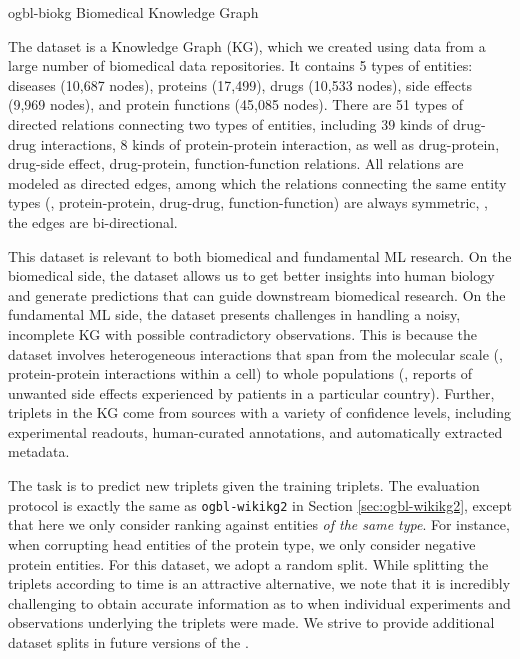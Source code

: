 \dataset
{ogbl-biokg}
{Biomedical Knowledge Graph}
{
The  dataset is a Knowledge Graph (KG), which we created using data from a large number of biomedical data repositories. 
It contains 5 types of entities: diseases (10,687 nodes), proteins (17,499), drugs (10,533 nodes), side effects (9,969 nodes), and protein functions (45,085 nodes). There are 51 types of directed relations connecting two types of entities, including 39 kinds of drug-drug interactions, 8 kinds of protein-protein interaction, as well as drug-protein, drug-side effect, drug-protein, function-function relations. All relations are modeled as directed edges, among which the relations connecting the same entity types (\eg, protein-protein, drug-drug, function-function) are always symmetric, \ie, the edges are bi-directional. 

This dataset is relevant to both biomedical and fundamental ML research.
On the biomedical side, the dataset allows us to get better insights into human biology and generate predictions that can guide downstream biomedical research. On the fundamental ML side, the dataset presents challenges in handling a noisy, incomplete KG with possible contradictory observations.
This is because the  dataset involves heterogeneous interactions that span from the molecular scale (\eg, protein-protein interactions within a cell) to whole populations (\eg, reports of unwanted side effects experienced by patients in a particular country). Further, triplets in the KG come from sources with a variety of confidence levels, including experimental readouts, human-curated annotations, and automatically extracted metadata. 
}
{The task is to predict new triplets given the training triplets. The evaluation protocol is exactly the same as \texttt{ogbl-wikikg2} in Section \ref{sec:ogbl-wikikg2}, except that here we only consider ranking against entities \emph{of the same type}. For instance, when corrupting head entities of the protein type, we only consider negative protein entities.
}
{For this dataset, we adopt a random split. While splitting the triplets according to time is an attractive alternative, we note that it is incredibly challenging to obtain accurate information as to when individual experiments and observations underlying the triplets were made. We strive to provide additional dataset splits in future versions of the \nameshort{}. 
}
